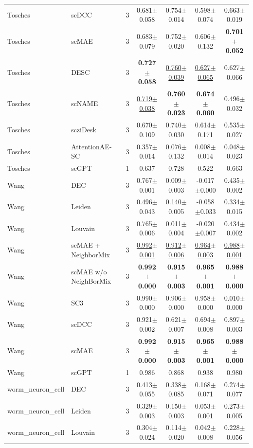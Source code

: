 \begin{table}[t]
\begin{tabular}{llrcccc}
Tosches & scDCC & 3 & 0.681$\pm$0.058 & 0.754$\pm$0.014 & 0.598$\pm$0.074 & 0.663$\pm$0.019 \\
Tosches & scMAE & 3 & 0.683$\pm$0.079 & 0.752$\pm$0.020 & 0.606$\pm$0.132 & \textbf{0.701$\pm$0.052} \\
Tosches & DESC & 3 & \textbf{0.727$\pm$0.058} & \underline{0.760$\pm$0.039} & \underline{0.627$\pm$0.065} & 0.627$\pm$0.066 \\
Tosches & scNAME & 3 & \underline{0.719$\pm$0.038} & \textbf{0.760$\pm$0.023} & \textbf{0.674$\pm$0.060} & 0.496$\pm$0.032 \\
Tosches & scziDesk & 3 & 0.670$\pm$0.109 & 0.740$\pm$0.030 & 0.614$\pm$0.171 & 0.535$\pm$0.027 \\
Tosches & AttentionAE-SC & 3 & 0.357$\pm$0.014 & 0.076$\pm$0.132 & 0.008$\pm$0.014 & 0.048$\pm$0.023 \\
Tosches & scGPT & 1 & 0.637 & 0.728 & 0.522 & 0.663 \\
\midrule
Wang & DEC & 3 & 0.767$\pm$0.001 & 0.009$\pm$0.003 & -0.017$\pm$0.000 & 0.435$\pm$0.002 \\
Wang & Leiden & 3 & 0.496$\pm$0.043 & 0.140$\pm$0.005 & -0.058$\pm$0.033 & 0.334$\pm$0.015 \\
Wang & Louvain & 3 & 0.765$\pm$0.006 & 0.011$\pm$0.004 & -0.020$\pm$0.007 & 0.434$\pm$0.002 \\
Wang & scMAE + NeighborMix & 3 & \underline{0.992$\pm$0.001} & \underline{0.912$\pm$0.006} & \underline{0.964$\pm$0.003} & \underline{0.988$\pm$0.001} \\
Wang & scMAE w/o NeighBorMix & 3 & \textbf{0.992$\pm$0.000} & \textbf{0.915$\pm$0.003} & \textbf{0.965$\pm$0.001} & \textbf{0.988$\pm$0.000} \\
Wang & SC3 & 3 & 0.990$\pm$0.000 & 0.906$\pm$0.000 & 0.958$\pm$0.000 & 0.010$\pm$0.000 \\
Wang & scDCC & 3 & 0.921$\pm$0.002 & 0.621$\pm$0.007 & 0.694$\pm$0.008 & 0.897$\pm$0.003 \\
Wang & scMAE & 3 & \textbf{0.992$\pm$0.000} & \textbf{0.915$\pm$0.003} & \textbf{0.965$\pm$0.001} & \textbf{0.988$\pm$0.000} \\
Wang & scGPT & 1 & 0.986 & 0.868 & 0.938 & 0.980 \\
\midrule
worm\_neuron\_cell & DEC & 3 & 0.413$\pm$0.055 & 0.338$\pm$0.085 & 0.168$\pm$0.071 & 0.274$\pm$0.077 \\
worm\_neuron\_cell & Leiden & 3 & 0.329$\pm$0.003 & 0.150$\pm$0.003 & 0.053$\pm$0.001 & 0.273$\pm$0.005 \\
worm\_neuron\_cell & Louvain & 3 & 0.304$\pm$0.024 & 0.114$\pm$0.020 & 0.042$\pm$0.008 & 0.228$\pm$0.056 \\

\end{tabular}
\end{table}
